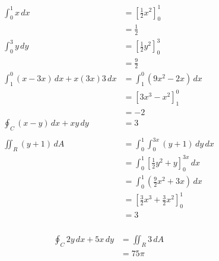 \documentclass{article}
\begin{document}
\begin{align*}
  \int_0^1 x \,dx                          & = \left[ \frac{1}{2} x^2 \right]_0^1                       \\
                                           & = \frac{1}{2}                                              \\
  \int_0^3 y \,dy                          & = \left[ \frac{1}{2} y^2 \right]_0^3                       \\
                                           & = \frac{9}{2}                                              \\
  \int_1^0 (x - 3 x) \,dx + x (3 x) 3 \,dx & = \int_1^0 (9 x^2 - 2 x) \,dx                              \\
                                           & = \left[ 3 x^3 - x^2 \right]_1^0                           \\
                                           & = -2                                                       \\
  \oint_C (x - y) \,dx + xy \,dy           & = 3                                                        \\ \\
  \iint_R (y + 1) \,dA                     & = \int_0^1 \int_0^{3 x} (y + 1) \,dy \,dx                  \\
                                           & = \int_0^1 \left[ \frac{1}{2} y^2 + y \right]_0^{3 x} \,dx \\
                                           & = \int_0^1 \left( \frac{9}{2} x^2 + 3 x \right) \,dx       \\
                                           & = \left[ \frac{3}{2} x^3 + \frac{3}{2} x^2 \right]_0^1     \\
                                           & = 3
\end{align*}

\setcounter{subsubsection}{4}
\subsubsection{}

\begin{align*}
  \oint_C 2 y \,dx + 5 x \,dy & = \iint_R 3 \,dA \\
                              & = 75 \pi
\end{align*}

\setcounter{subsubsection}{6}
\subsubsection{}
\end{document}
